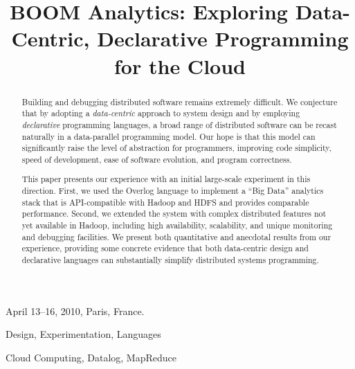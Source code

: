 \documentclass[10pt]{sigplanconf}
\newcommand{\BOOMA} {BOOM Analytics\xspace}
\begin{document}
\title{\BOOMA: Exploring Data-Centric, Declarative Programming for the Cloud}
 {April 13--16, 2010, Paris, France.}


\maketitle
\begin{abstract}
  Building and debugging distributed software remains extremely difficult. We
  conjecture that by adopting a \emph{data-centric} approach to system design
  and by employing \emph{declarative} programming languages, a broad range of
  distributed software can be recast naturally in a data-parallel programming
  model.  Our hope is that this model can significantly raise the level of
  abstraction for programmers, improving code simplicity, speed of development,
  ease of software evolution, and program correctness.

  This paper presents our experience with an initial large-scale experiment in
  this direction.  First, we used the Overlog language to implement a ``Big
  Data'' analytics stack that is API-compatible with Hadoop and HDFS and
  provides comparable performance.  Second, we extended the system with complex
  distributed features not yet available in Hadoop, including high availability,
  scalability, and unique monitoring and debugging facilities. We present both
  quantitative and anecdotal results from our experience, providing some
  concrete evidence that both data-centric design and declarative languages can
  substantially simplify distributed systems programming.
\end{abstract}


\terms Design, Experimentation, Languages

\keywords
Cloud Computing, Datalog, MapReduce






















\balance


\end{document}
